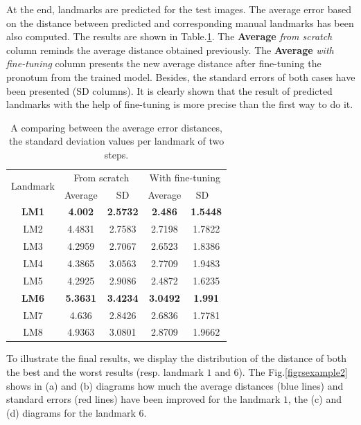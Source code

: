 \documentclass[10pt]{article}
\begin{document}
At the end, landmarks are predicted for the test images. The average error based on the distance between
predicted and corresponding manual landmarks has been also computed. The results
are shown in Table.\ref{tab2}. The \textbf{Average} \textit{from scratch} column reminds
the average distance obtained previously. The \textbf{Average} \textit{with fine-tuning}
column presents the new average distance
after fine-tuning the pronotum from the trained model. Besides, the standard errors of both cases have been presented (SD columns). It is
clearly shown that the result of predicted landmarks with the help of
fine-tuning is more precise than the first way to do it.

\begin{table}[htbp]
\centering
\begin{tabular}{ | c | c | c | c | c | }
\hline
	\multicolumn{1}{|c|}{\multirow{2}{*}{Landmark}} & \multicolumn{2}{c|}{From scratch} &  \multicolumn{2}{c|}{With fine-tuning}  \\ \cline{2-5}
	 & Average & SD & Average & SD \  \\ \hline
	\textbf{LM1} & \textbf{4.002} & \textbf{2.5732} & \textbf{2.486} & \textbf{1.5448} \\ \hline
	LM2 & 4.4831 & 2.7583 & 2.7198 & 1.7822 \\ \hline
	LM3 & 4.2959 & 2.7067 & 2.6523 & 1.8386 \\ \hline
	LM4 & 4.3865 & 3.0563 & 2.7709 & 1.9483 \\ \hline
	LM5 & 4.2925 & 2.9086 & 2.4872 & 1.6235 \\ \hline
	\textbf{LM6} & \textbf{5.3631} & \textbf{3.4234} & \textbf{3.0492} & \textbf{1.991} \\ \hline
	LM7 & 4.636 & 2.8426 & 2.6836 & 1.7781 \\ \hline
	LM8 & 4.9363 & 3.0801 & 2.8709 & 1.9662 \\ \hline
\end{tabular}
\caption{\small{A comparing between the average error distances, the standard deviation values per landmark of two steps.}}
\label{tab2}
\end{table}

To illustrate the final results, we display the distribution of the
distance of both the best and the worst results (resp. landmark $1$
and $6$). The Fig.\ref{figrsexample2} shows in (a) and (b) diagrams
 how much the average distances (blue lines) and standard errors (red lines) have
 been improved for the landmark $1$, the (c) and (d) diagrams for the
 landmark $6$.
\end{document}

